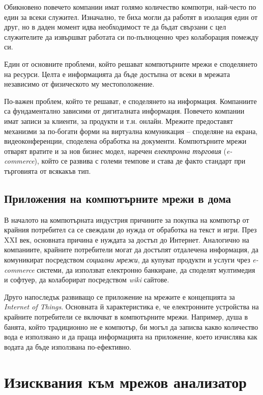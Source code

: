 \documentclass[12pt,a4paper,oneside]{book}
\begin{document}
Обикновено повечето компании имат голямо количество компютри, най-често по един
за всеки служител. Изначално, те биха могли да работят в изолация един от друг,
но в даден момент идва необходимост те да бъдат свързани с цел служителите да
извършват работата си по-пълноценно чрез колаборация помежду си.

Един от основните проблеми, който решават компютърните мрежи е
споделянето на ресурси. Целта е информацията да бъде достъпна от всеки
в мрежата независимо от физическото му местоположение.

По-важен проблем, който те решават, е споделянето на
информация. Компаниите са фундаментално зависими от дигиталната
информация. Повечето компании имат записи за клиенти, за продукти и т.н. онлайн.
Мрежите предоставят механизми за по-богати форми на виртуална комуникация --
споделяне на екрана, видеоконференции, споделена обработка на документи.
Компютърните мрежи отварят вратите и за нов бизнес модел, наречен \textit{електронна
търговия} (\textit{e-commerce}), който се развива с големи темпове и става де
факто стандарт при търговията от всякакъв тип. \cite{tanenbaum_computer_2011}

\subsection{Приложения на компютърните мрежи в дома}

В началото на компютърната индустрия причините за покупка на компютър от крайния
потребител са се свеждали до нужда от обработка на текст и игри. През XXI век,
основната причина е нуждата за достъп до
Интернет. Аналогично на компаниите, крайните потребители могат да достъпят
отдалечена информация, да комуникират посредством \textit{социални мрежи},
да купуват продукти и услуги чрез \textit{e-commerce} системи, да използват електронно
банкиране, да споделят мултимедия и софтуер, да колаборират посредством
\textit{wiki} сайтове.

Друго напоследък развиващо се приложение на мрежите е концепцията за
\textit{Internet of Things}. Основната й характеристика е, че електронните
устройства на крайните потребители се включват в компютърните мрежи. Например,
душа в банята, който традиционно не е компютър, би могъл да записва какво количество
вода е използвано и да праща информацията на приложение, което изчислява как
водата да бъде използвана по-ефективно.

\section{Изисквания към мрежов анализатор}
\end{document}
